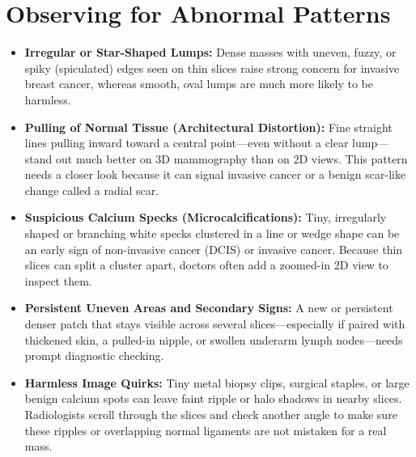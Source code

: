 \section{Observing for Abnormal Patterns}
\begin{itemize}
\item \textbf{Irregular or Star-Shaped Lumps:} Dense masses with uneven, fuzzy, or spiky (spiculated) edges seen on thin slices raise strong concern for invasive breast cancer, whereas smooth, oval lumps are much more likely to be harmless.
\item \textbf{Pulling of Normal Tissue (Architectural Distortion):} Fine straight lines pulling inward toward a central point---even without a clear lump---stand out much better on 3D mammography than on 2D views. This pattern needs a closer look because it can signal invasive cancer or a benign scar-like change called a radial scar.
\item \textbf{Suspicious Calcium Specks (Microcalcifications):} Tiny, irregularly shaped or branching white specks clustered in a line or wedge shape can be an early sign of non-invasive cancer (DCIS) or invasive cancer. Because thin slices can split a cluster apart, doctors often add a zoomed-in 2D view to inspect them.
\item \textbf{Persistent Uneven Areas and Secondary Signs:} A new or persistent denser patch that stays visible across several slices---especially if paired with thickened skin, a pulled-in nipple, or swollen underarm lymph nodes---needs prompt diagnostic checking.
\item \textbf{Harmless Image Quirks:} Tiny metal biopsy clips, surgical staples, or large benign calcium spots can leave faint ripple or halo shadows in nearby slices. Radiologists scroll through the slices and check another angle to make sure these ripples or overlapping normal ligaments are not mistaken for a real mass.
\end{itemize}

